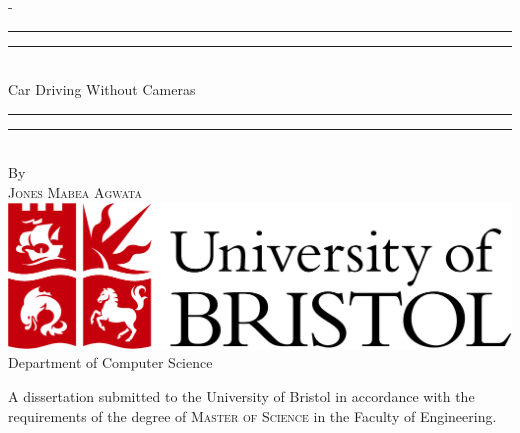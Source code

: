 %
%
% 
%
%
\begin{titlingpage}
\begin{SingleSpace}
\calccentering{\unitlength} 
\begin{adjustwidth*}{\unitlength}{-\unitlength}
\vspace*{13mm}
\begin{center}
\rule[0.5ex]{\linewidth}{2pt}\vspace*{-\baselineskip}\vspace*{3.2pt}
\rule[0.5ex]{\linewidth}{1pt}\\[\baselineskip]
{\HUGE Car Driving Without Cameras }\\[4mm]
\rule[0.5ex]{\linewidth}{1pt}\vspace*{-\baselineskip}\vspace{3.2pt}
\rule[0.5ex]{\linewidth}{2pt}\\
\vspace{6.5mm}
{\large By}\\
\vspace{6.5mm}
{\large\textsc{Jones Mabea Agwata}}\\
\vspace{11mm}
\includegraphics[scale=0.4]{logos/bristollogo_colour}\\
\vspace{6mm}
{\large Department of Computer Science}\\
\vspace{11mm}
\begin{minipage}{10cm}
A dissertation submitted to the University of Bristol in accordance with the requirements of the degree of \textsc{Master of Science} in the Faculty of Engineering.


\end{minipage}
\end{center}
\end{adjustwidth*}
\end{SingleSpace}
\end{titlingpage}
